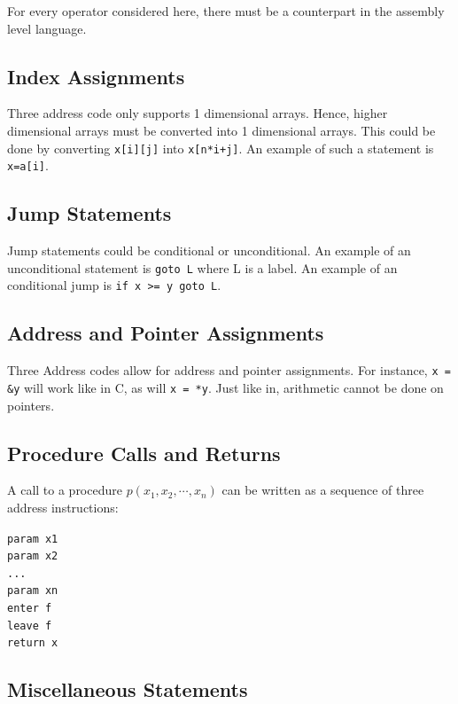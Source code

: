 \documentclass[12pt,letterpaper]{book}
\theoremstyle{definition}
\begin{document}
For every operator considered here, there must be a counterpart in the assembly level language.

\subsection{Index Assignments}

Three address code only supports 1 dimensional arrays. Hence, higher dimensional arrays must be converted into 1 dimensional arrays. This could be done by converting \texttt{x[i][j]} into \texttt{x[n*i+j]}. An example of such a statement is \texttt{x=a[i]}.

\subsection{Jump Statements}

Jump statements could be conditional or unconditional. An example of an unconditional statement is \texttt{goto L} where L is a label. An example of an conditional jump is \texttt{if x >= y goto L}.

\subsection{Address and Pointer Assignments}

Three Address codes allow for address and pointer assignments. For instance, \texttt{x = \&y} will work like in C, as will \texttt{x = *y}. Just like in, arithmetic cannot be done on pointers.

\subsection{Procedure Calls and Returns}

A call to a procedure $p(x_1,x_2, \cdots, x_n)$ can be written as a sequence of three address instructions:

\texttt{param x1}\\
\texttt{param x2}\\
\texttt{...}\\
\texttt{param xn} \\
\texttt{enter f}\\
\texttt{leave f} \\ 
\texttt{return x} \\

\subsection{Miscellaneous Statements}
\end{document}
